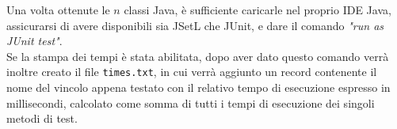 \documentclass{article}
\begin{document}
Una volta ottenute le $n$ classi Java, è sufficiente caricarle nel proprio IDE Java, assicurarsi di avere disponibili sia JSetL che JUnit, e dare il comando \emph{"run as JUnit test"}.\\
Se la stampa dei tempi è stata abilitata, dopo aver dato questo comando verrà inoltre creato il file \texttt{times.txt}, in cui verrà aggiunto un record contenente il nome del vincolo appena testato con il relativo tempo di esecuzione espresso in millisecondi, calcolato come somma di tutti i tempi di esecuzione dei singoli metodi di test.\\

\newpage
\thispagestyle{empty}
\mbox{}
\end{document}
